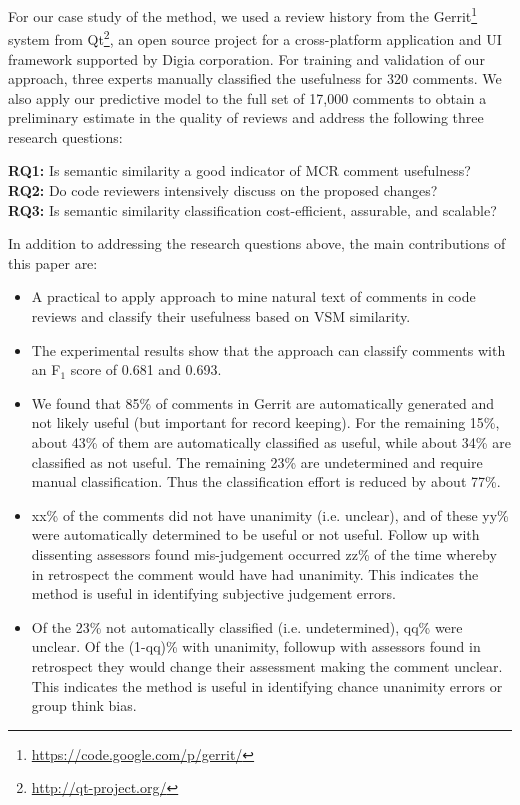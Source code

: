 For our case study of the method, we used a review history from the Gerrit\footnote{\url{https://code.google.com/p/gerrit/}} system from Qt\footnote{\url{http://qt-project.org/}}, an open source project for a cross-platform application and UI framework supported by Digia corporation.
For training and validation of our approach, three experts manually classified the usefulness for 320 comments.
We also apply our predictive model to the full set of 17,000 
comments to obtain a preliminary estimate in the quality of reviews and address the following three research questions:

\noindent \textbf{RQ1:} Is semantic similarity a good indicator of MCR comment usefulness?\\
\noindent \textbf{RQ2:} Do code reviewers intensively discuss on the proposed changes?\\
\noindent \textbf{RQ3:} Is semantic similarity classification cost-efficient, assurable, and scalable?

\noindent In addition to addressing the research questions above, the main contributions of this paper are:
\begin{itemize}
\item A practical to apply approach to mine natural text of comments in code reviews and classify their usefulness based on VSM similarity.
\item The experimental results show that the approach can classify comments with an F$_1$ score of 0.681 and 0.693.
\item We found that 85\% of comments in Gerrit are automatically generated and not likely useful (but important for record keeping). For the remaining 15\%, about 43\% of them are automatically classified as useful, while about 34\% are classified as not useful. The remaining 23\% are undetermined and require manual classification. Thus the classification effort is reduced by about 77\%.
\item xx\% of the comments did not have unanimity (i.e. unclear), and of these yy\% were automatically determined to be useful or not useful. Follow up with dissenting assessors found mis-judgement occurred zz\% of the time whereby in retrospect the comment would have had unanimity. This indicates the method is useful in identifying subjective judgement errors. 
\item Of the 23\% not automatically classified (i.e. undetermined), qq\% were unclear. Of the (1-qq)\% with unanimity, followup with assessors found in retrospect they would change their assessment making the comment unclear. This indicates the method is useful in identifying chance unanimity errors or group think bias.
\end{itemize} 

